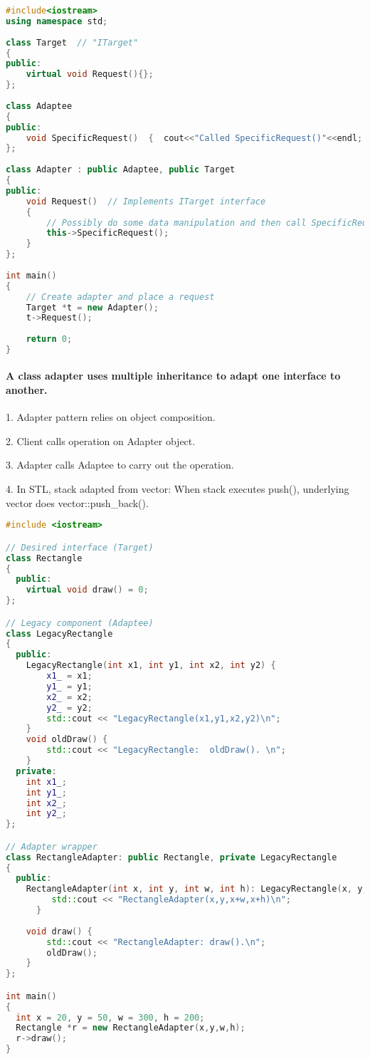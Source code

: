 \documentclass{book}
\begin{document}
\begin{lstlisting}[caption={Adapter Pattern - Diagram sample 1}, language=c++]
#include<iostream>  
using namespace std;  
  
class Target  // "ITarget"  
{  
public:  
    virtual void Request(){};  
};  
  
class Adaptee  
{  
public:  
    void SpecificRequest()  {  cout<<"Called SpecificRequest()"<<endl;  }  
};  
  
class Adapter : public Adaptee, public Target  
{  
public:  
    void Request()  // Implements ITarget interface  
    {  
        // Possibly do some data manipulation and then call SpecificRequest    
        this->SpecificRequest();  
    }  
};  
  
int main()  
{  
    // Create adapter and place a request  
    Target *t = new Adapter();  
    t->Request();  
  
    return 0;  
}  
\end{lstlisting}

\paragraph{A class adapter uses multiple inheritance to adapt one interface to another.}\mbox{}
1.    Adapter pattern relies on object composition.

2.    Client calls operation on Adapter object.

3.    Adapter calls Adaptee to carry out the operation.

4.    In STL, stack adapted from vector: When stack executes push(), underlying vector does vector::push\_back().
\begin{lstlisting}[caption={Adapter Pattern - sample 1}, language=c++]
#include <iostream>

// Desired interface (Target)
class Rectangle 
{
  public:
    virtual void draw() = 0;
};

// Legacy component (Adaptee)
class LegacyRectangle 
{
  public:
    LegacyRectangle(int x1, int y1, int x2, int y2) {
        x1_ = x1;
        y1_ = y1;
        x2_ = x2;
        y2_ = y2;
        std::cout << "LegacyRectangle(x1,y1,x2,y2)\n";
    }
    void oldDraw() {
        std::cout << "LegacyRectangle:  oldDraw(). \n";
    }
  private:
    int x1_;
    int y1_;
    int x2_;
    int y2_;
};

// Adapter wrapper
class RectangleAdapter: public Rectangle, private LegacyRectangle 
{
  public:
    RectangleAdapter(int x, int y, int w, int h): LegacyRectangle(x, y, x + w, y + h) {
         std::cout << "RectangleAdapter(x,y,x+w,x+h)\n";
      }
    
    void draw() {
        std::cout << "RectangleAdapter: draw().\n"; 
        oldDraw();
    }
};

int main()
{
  int x = 20, y = 50, w = 300, h = 200;
  Rectangle *r = new RectangleAdapter(x,y,w,h);
  r->draw();
}
\end{lstlisting}
\end{document}
